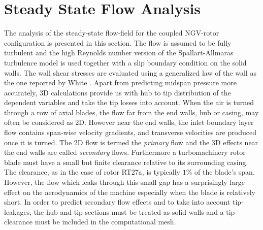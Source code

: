 %
%
%
%
\section{Steady State Flow Analysis}
\label{rt27_steady.sec}
%
%
 The analysis of the steady-state flow-field for
 the coupled NGV-rotor configuration is presented in this section.
 The flow is assumed to be fully turbulent
 and the high Reynolds number version of the Spallart-Allmaras
 \citeyear{Spalart:1} turbulence model
 is used together with a slip boundary condition on the solid walls. The
 wall shear stresses are evaluated using a generalized law of the wall
 as the one reported by White \citeyear{White:1}.
 Apart from predicting midspan pressure more accurately,
 3D calculations provide us with hub to tip
 distribution of the dependent variables
 and take the tip losses into account.
 When the air is turned through a row of axial blades,
 the flow far from the end walls,
 hub or casing, may often be considered as 2D.
 However near the end walls, the inlet boundary layer flow contains
 span-wise velocity gradients, and transverse velocities
 are produced once it is turned.
 The 2D flow is termed the {\em primary} flow
 and the 3D effects near the end walls are called {\em secondary}
 flows.
 Furthermore a turbomachinery rotor blade must have a small but finite clearance
 relative to its surrounding casing. The clearance, as in the case of rotor RT27a,
 is typically $1\%$ of the blade's span. However, the flow which leaks through
 this small gap has a surprisingly large effect on the aerodynamics of the machine
 especially when the blade is relatively short.
 In order to predict secondary flow effects and to take into account
 tip-leakages, the hub and tip sections must be treated as solid walls
 and a tip clearance must be included in the computational mesh.
%
%
%
